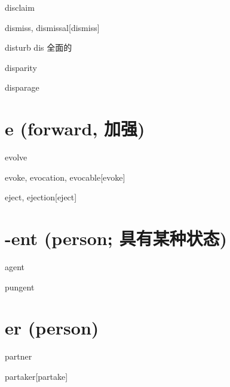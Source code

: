 \begin{RefWord}{disclaim}
\end{RefWord}

\begin{RefWord}{dismiss, dismissal}[dismiss]
\end{RefWord}

\begin{RefWord}{disturb}
    dis 全面的
\end{RefWord}

\begin{RefWord}{disparity}
\end{RefWord}

\begin{RefWord}{disparage}
\end{RefWord}

\section{e (forward, 加强)}

\begin{RefWord}{evolve}
\end{RefWord}

\begin{RefWord}{evoke, evocation, evocable}[evoke]
\end{RefWord}

\begin{RefWord}{eject, ejection}[eject]
\end{RefWord}

\section{-ent (person; 具有某种状态)}

\begin{RefWord}{agent}
\end{RefWord}

\begin{RefWord}{pungent}
\end{RefWord}

\section{er (person)}

\begin{RefWord}{partner}
\end{RefWord}

\begin{RefWord}{partaker}[partake]
\end{RefWord}

